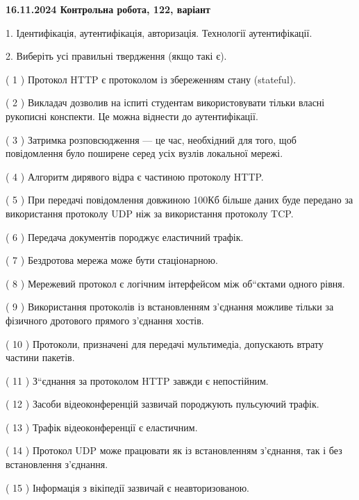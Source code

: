 \documentclass[12pt, ukrainian]{article}
\begin{document}
\vspace{4mm}
\newpage
\begin {large}

\textbf{16.11.2024 Контрольна робота, 122, варіант  }\par


{
1. Ідентифікація, аутентифікація, авторизація. Технології аутентифікації.



\vspace{5mm}
2. Виберіть усі правильні твердження (якщо такі є).\par
\vspace{2mm}

( 1 ) Протокол  HTTP є протоколом із збереженням стану (stateful).

( 2 ) Викладач дозволив на іспиті студентам використовувати тільки власні рукописні конспекти. Це можна віднести до аутентифікації.

( 3 ) Затримка розповсюдження — це час, необхідний для того, щоб повідомлення було поширене серед усіх вузлів локальної мережі.

( 4 ) Алгоритм дирявого відра є частиною протоколу HTTP.

( 5 ) При передачі повідомлення довжиною 100Кб більше даних буде передано за використання протоколу UDP ніж за використання протоколу TCP.

( 6 ) Передача документів породжує еластичний трафік.

( 7 ) Бездротова мережа може бути стаціонарною.

( 8 ) Мережевий протокол є логічним інтерфейсом між об“єктами одного рівня.

( 9 ) Використання протоколів із встановленням з'єднання можливе тільки за фізичного дротового прямого з'єднання хостів.

( 10 ) Протоколи, призначені для передачі мультимедіа, допускають втрату частини пакетів.

( 11 ) З“єднання за протоколом  HTTP завжди є непостійним.

( 12 ) Засоби відеоконференцій зазвичай породжують пульсуючий трафік.

( 13 ) Трафік відеоконференції є еластичним.

( 14 ) Протокол UDP може працювати як із встановленням з'єднання, так і без встановлення з'єднання.

( 15 ) Інформація з вікіпедії зазвичай є неавторизованою.
}
\end {large}
\end{document}
